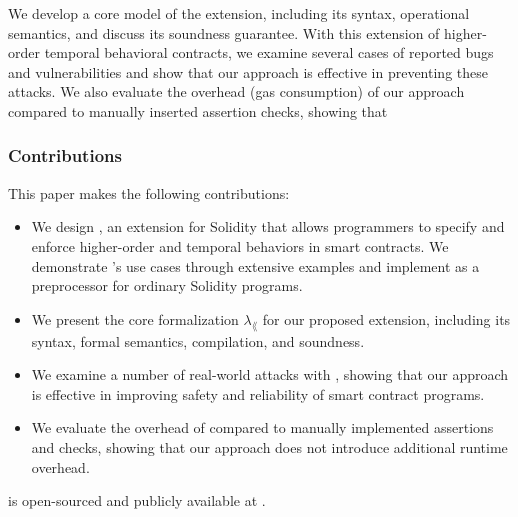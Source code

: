 We develop a core model of the extension, including its syntax,
operational semantics, and discuss its soundness guarantee.
With this extension of higher-order temporal behavioral contracts, we examine
several cases of reported bugs and vulnerabilities and show that
our approach is effective in preventing these attacks.
We also evaluate the overhead (gas consumption) of our approach
compared to manually inserted assertion checks, showing that 




\subsubsection*{\textbf{Contributions}} This paper makes the following contributions:
\begin{itemize}
  \item We design \lang, an extension for Solidity that allows programmers to
        specify and enforce higher-order and temporal behaviors in smart contracts.
        We demonstrate \lang's use cases through extensive examples and
        implement \lang as a preprocessor for ordinary Solidity programs.
	\item We present the core formalization $\lambda_\lang$ for our proposed
	      extension, including its syntax, formal semantics, compilation, and
	      soundness.
  \item We examine a number of real-world attacks with \lang, showing that our
        approach is effective in improving safety and reliability of smart contract
        programs.
  \item We evaluate the overhead of \lang compared to manually implemented
        assertions and checks, showing that our approach does not introduce
        additional runtime overhead.
\end{itemize}
\lang is open-sourced and publicly available at .

